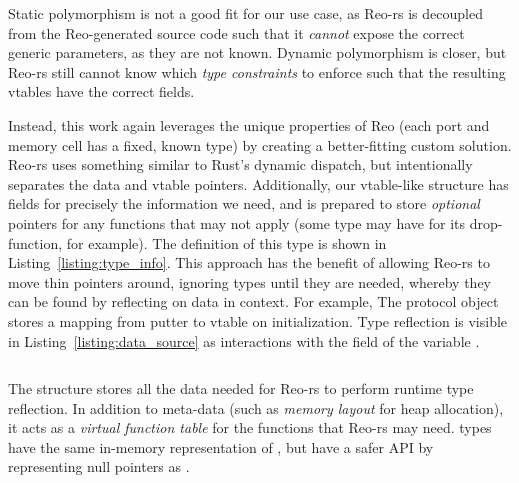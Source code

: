 Static polymorphism is not a good fit for our use case, as Reo-rs is decoupled from the Reo-generated source code such that it \textit{cannot} expose the correct generic parameters, as they are not known. Dynamic polymorphism is closer, but Reo-rs still cannot know which \textit{type constraints} to enforce such that the resulting vtables have the correct fields.

Instead, this work again leverages the unique properties of Reo (each port and memory cell has a fixed, known type) by creating a better-fitting custom solution. Reo-rs uses something similar to Rust's dynamic dispatch, but intentionally separates the data and vtable pointers. Additionally, our vtable-like structure has fields for precisely the information we need, and is prepared to store \textit{optional} pointers for any functions that may not apply (some type may have  for its drop-function, for example). The definition of this type is shown in Listing~\ref{listing:type_info}. This approach has the benefit of allowing Reo-rs to move thin pointers around, ignoring types until they are needed, whereby they can be found by reflecting on data in context. For example, The protocol object stores a mapping from putter to vtable on initialization. Type reflection is visible in Listing~\ref{listing:data_source} as interactions with the  field of the variable .


\begin{listing}[ht]
	\inputminted[]{rust}{type_info.rs}
	\caption{The  structure stores all the data needed for Reo-rs to perform runtime type reflection. In addition to meta-data (such as \textit{memory layout} for heap allocation), it acts as a \textit{virtual function table} for the functions that Reo-rs may need.  types have the same in-memory representation of , but have a safer API by representing null pointers as .}
	\label{listing:type_info}
\end{listing}


